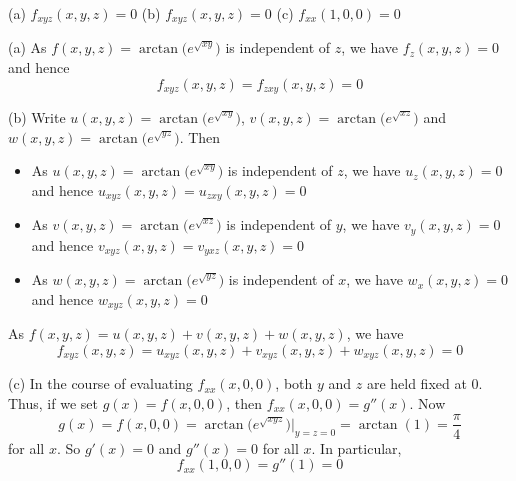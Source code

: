 \begin{answer}
(a) $f_{xyz}(x,y,z)=0$\qquad
(b) $f_{xyz}(x,y,z)=0$\qquad
(c) $f_{xx}(1,0,0)=0$
\end{answer}

\begin{solution}
(a) 
As $f(x,y,z) = \arctan\big(e^{\sqrt{xy}}\big)$ is independent of $z$,
we have $f_z(x,y,z) = 0$ and hence
\begin{equation*}
f_{xyz}(x,y,z)
=f_{zxy}(x,y,z)
=0
\end{equation*}

(b) Write $u(x,y,z) = \arctan\big(e^{\sqrt{xy}}\big)$,
          $v(x,y,z) = \arctan\big(e^{\sqrt{xz}}\big)$ and
          $w(x,y,z) = \arctan\big(e^{\sqrt{yz}}\big)$.
Then
\begin{itemize}
\item
As $u(x,y,z) = \arctan\big(e^{\sqrt{xy}}\big)$ is independent of $z$,
we have $u_z(x,y,z) = 0$ and hence
$
u_{xyz}(x,y,z)
=u_{zxy}(x,y,z)
=0
$
\item
As $v(x,y,z) = \arctan\big(e^{\sqrt{xz}}\big)$ is independent of $y$,
we have $v_y(x,y,z) = 0$ and hence
$
v_{xyz}(x,y,z)
=v_{yxz}(x,y,z)
=0
$
\item
As $w(x,y,z) = \arctan\big(e^{\sqrt{yz}}\big)$ is independent of $x$,
we have $w_x(x,y,z) = 0$ and hence
$
w_{xyz}(x,y,z)
=0
$
\end{itemize}
As $f(x,y,z)=u(x,y,z)+v(x,y,z)+w(x,y,z)$, we have
\begin{equation*}
f_{xyz}(x,y,z)=u_{xyz}(x,y,z)+v_{xyz}(x,y,z)+w_{xyz}(x,y,z)=0
\end{equation*}

(c) In the course of evaluating $f_{xx}(x,0,0)$, both $y$ and $z$ are held fixed at $0$. Thus, if we set $g(x) = f(x,0,0)$, then  $f_{xx}(x,0,0)=g''(x)$.
Now
\begin{equation*}
g(x) = f(x,0,0) = \arctan\big(e^{\sqrt{xyz}}\big)\Big|_{y=z=0}
                =\arctan(1)
                =\frac{\pi}{4}
\end{equation*}
for all $x$. So $g'(x)=0$ and $g''(x)=0$ for all $x$. In particular,
\begin{equation*}
f_{xx}(1,0,0) = g''(1) = 0
\end{equation*}

\end{solution}




